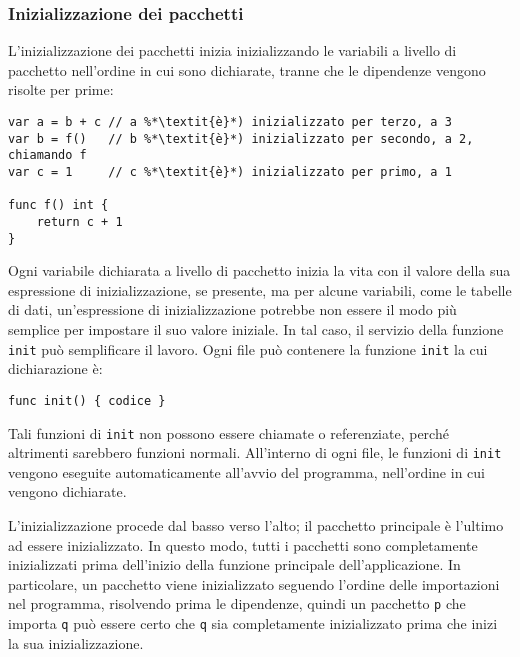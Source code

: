 \documentclass[../../../thesis.tex]{subfiles}
\begin{document}
    \subsubsection{Inizializzazione dei pacchetti}
    L'inizializzazione dei pacchetti inizia inizializzando le variabili a livello di pacchetto nell'ordine in cui sono dichiarate, tranne che le dipendenze vengono risolte per prime:
    \begin{lstlisting}[frame = single,label={lst:lstlisting1-5-1.1}]
var a = b + c // a %*\textit{è}*) inizializzato per terzo, a 3
var b = f()   // b %*\textit{è}*) inizializzato per secondo, a 2, chiamando f
var c = 1     // c %*\textit{è}*) inizializzato per primo, a 1

func f() int {
    return c + 1
}
    \end{lstlisting}
    Ogni variabile dichiarata a livello di pacchetto inizia la vita con il valore della sua espressione di inizializzazione, se presente, ma per alcune variabili, come le tabelle di dati, un'espressione di inizializzazione potrebbe non essere il modo più semplice per impostare il suo valore iniziale.
    In tal caso, il servizio della funzione \verb"init" può semplificare il lavoro.
    Ogni file può contenere la funzione \verb"init" la cui dichiarazione è:
    \begin{lstlisting}[label={lst:lstlisting1-5-1.2}]
func init() { codice }
    \end{lstlisting}
    Tali funzioni di \verb"init" non possono essere chiamate o referenziate, perché altrimenti sarebbero funzioni normali.
    All'interno di ogni file, le funzioni di \verb"init" vengono eseguite automaticamente all'avvio del programma, nell'ordine in cui vengono dichiarate.
    \hfill \vspace{12pt}

    L'inizializzazione procede dal basso verso l'alto;
    il pacchetto principale è l'ultimo ad essere inizializzato.
    In questo modo, tutti i pacchetti sono completamente inizializzati prima dell'inizio della funzione principale dell'applicazione.
    In particolare, un pacchetto viene inizializzato seguendo l'ordine delle importazioni nel programma, risolvendo prima le dipendenze, quindi un pacchetto \verb"p" che importa \verb"q" può essere certo che \verb"q" sia completamente inizializzato prima che inizi la sua inizializzazione.
\end{document}
